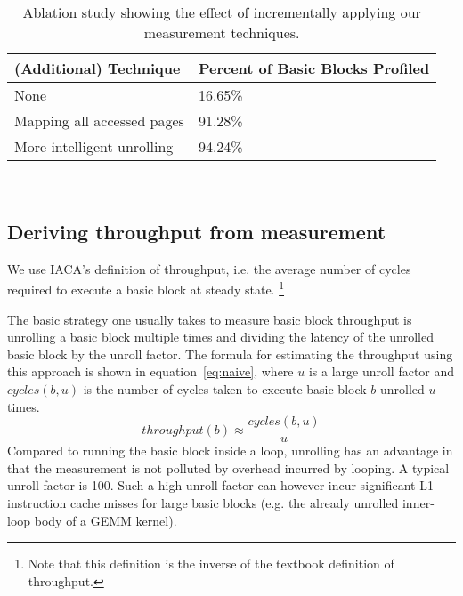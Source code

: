 %
%

\begin{table}
\begin{tabular}{
|p{}|p{}|}
\hline
\textbf{(Additional) Technique} & \textbf{Percent of Basic Blocks Profiled} \\
\hline
None & 16.65\% \\

\hline
Mapping all accessed pages & 91.28\% \\

\hline
More intelligent unrolling & 94.24\% \\

\hline
\end{tabular}
\\
\caption{Ablation study showing the effect of incrementally applying our measurement techniques.}
\label{tab:full-ablation}
\end{table}


\subsection{Deriving throughput from measurement}
We use IACA's definition of throughput, i.e. 
the average number of cycles required to execute a basic block 
at steady state.
\footnote{Note that this definition is the inverse of the textbook definition of throughput.}

The basic strategy one usually takes to measure basic block throughput
is unrolling a basic block multiple times and dividing the latency of the
unrolled basic block by the unroll factor.
The formula for estimating the throughput using this approach is shown
in equation~\ref{eq:naive}, where $u$ is a large unroll factor
and $\mathit{cycles}(b,u)$ is the number of cycles taken to execute basic block $b$
unrolled $u$ times.
\begin{equation}
\mathit{throughput}(b) \approx \frac{\mathit{cycles}(b,u)}{u}
\label{eq:naive}
\end{equation}
Compared to running the basic block inside a loop,
unrolling has an advantage in that the measurement is not polluted by
overhead incurred by looping.
A typical unroll factor is 100\cite{ithemal,uops}.
Such a high unroll factor can however incur significant
L1-instruction cache misses for large basic blocks
(e.g. the already unrolled inner-loop body of a GEMM kernel).

